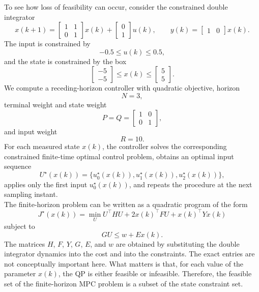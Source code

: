 To see how loss of feasibility can occur, consider the constrained double integrator
\[
    x(k+1)
    =
    \begin{bmatrix}
        1 & 1\\
        0 & 1
    \end{bmatrix}x(k)
    +
    \begin{bmatrix}
        0\\
        1
    \end{bmatrix}u(k),
    \qquad
    y(k)
    =
    \begin{bmatrix}
        1 & 0
    \end{bmatrix}x(k).
\]
The input is constrained by
\[
    -0.5 \leq u(k) \leq 0.5,
\]
and the state is constrained by the box
\[
    \begin{bmatrix}
        -5\\
        -5
    \end{bmatrix}
    \leq
    x(k)
    \leq
    \begin{bmatrix}
        5\\
        5
    \end{bmatrix}.
\]
We compute a receding-horizon controller with quadratic objective, horizon
\[
    N=3,
\]
terminal weight and state weight
\[
    P=Q=
    \begin{bmatrix}
        1 & 0\\
        0 & 1
    \end{bmatrix},
\]
and input weight
\[
    R=10.
\]
For each measured state \(x(k)\), the controller solves the corresponding constrained finite-time
optimal control problem, obtains an optimal input sequence
\[
    U^\star(x(k))
    =
    \{u_0^\star(x(k)),u_1^\star(x(k)),u_2^\star(x(k))\},
\]
applies only the first input \(u_0^\star(x(k))\), and repeats the procedure at the next sampling
instant.\\
The finite-horizon problem can be written as a quadratic program of the form
\[
    J^\star(x(k))
    =
    \min_U
    U^\top H U + 2x(k)^\top F U + x(k)^\top Yx(k)
\]
subject to
\[
    GU \leq w + Ex(k).
\]
The matrices \(H\), \(F\), \(Y\), \(G\), \(E\), and \(w\) are obtained by substituting the double
integrator dynamics into the cost and into the constraints. The exact entries are not conceptually
important here. What matters is that, for each value of the parameter \(x(k)\), the QP is either
feasible or infeasible. Therefore, the feasible set of the finite-horizon MPC problem is a subset
of the state constraint set.\\

